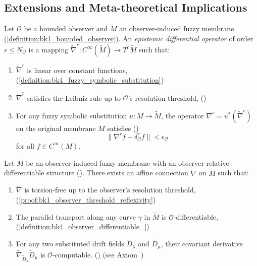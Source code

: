 \subsection{Extensions and Meta-theoretical Implications} \label{subsec:bk4_extensions_meta_theoretical_implications}
\begin{definition} \label{definition:bk4_epistemic_differential_o}
Let $\mathcal{O}$ be a bounded observer and $\tilde{M}$ an observer-induced fuzzy membrane (\ref{definition:bk1_bounded_observer}). An \emph{epistemic differential operator} of order $r \leq N_\mathcal{O}$ is a mapping $\tilde{\nabla}^r: C^\infty(\tilde{M}) \to T^r\tilde{M}$ such that:
\begin{enumerate}
\item $\tilde{\nabla}^r$ is linear over constant functions, (\ref{definition:bk4_fuzzy_symbolic_substitution})
\item $\tilde{\nabla}^r$ satisfies the Leibniz rule up to $\mathcal{O}$'s resolution threshold, ()
\item For any fuzzy symbolic substitution $u: M \to \tilde{M}$, the operator $\nabla^r = u^*(\tilde{\nabla}^r)$ on the original membrane $M$ satisfies ()
    \[
    \|\nabla^r f - \delta^r_\mathcal{O} f\| < \epsilon_\mathcal{O}
    \]
    for all $f \in C^\infty(M)$.
\end{enumerate}
\end{definition}
\begin{proposition}
\label{prop:bk4_fuzzy_connection} 
Let $\tilde{M}$ be an observer-induced fuzzy membrane with an observer-relative differentiable structure (). There exists an affine connection $\tilde{\nabla}$ on $\tilde{M}$ such that:
\begin{enumerate}
\item $\tilde{\nabla}$ is torsion-free up to the observer's resolution threshold, (\ref{proof:bk1_observer_threshold_reflexivity})
\item The parallel transport along any curve $\gamma$ in $\tilde{M}$ is $\mathcal{O}$-differentiable, (\ref{definition:bk4_observer_differentiable_})
\item For any two substituted drift fields $\tilde{D}_\lambda$ and $\tilde{D}_\mu$, their covariant derivative $\tilde{\nabla}_{\tilde{D}_\lambda}\tilde{D}_\mu$ is $\mathcal{O}$-computable. () (see Axiom~)
\end{enumerate}
\end{proposition}
